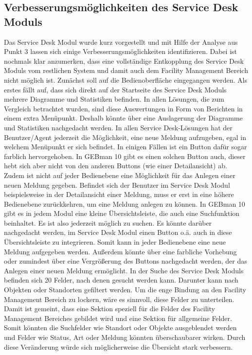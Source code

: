\subsection{Verbesserungsmöglichkeiten des Service Desk Moduls}
\noindent
Das Service Desk Modul wurde kurz vorgestellt und mit Hilfe der Analyse aus Punkt 3 lassen sich einige Verbesserungsmöglichkeiten identifizieren. Dabei ist nochmals klar anzumerken, dass eine vollständige Entkopplung des Service Desk Moduls vom restlichen System und damit auch dem Facility Management Bereich nicht möglich ist.\newline
Zunächst soll auf die Bedienoberfläche eingegangen werden. Als erstes fällt auf, dass sich direkt auf der Startseite des Service Desk Moduls mehrere Diagramme und Statistiken befinden. In allen Lösungen, die zum Vergleich betrachtet wurden, sind diese Auswertungen in Form von Berichten in einem extra Menüpunkt. Deshalb könnte über eine Auslagerung der Diagramme und Statistiken nachgedacht werden.\newline
In allen Service Desk-Lösungen hat der Benutzer/Agent jederzeit die Möglichkeit, eine neue Meldung aufzugeben, egal in welchem Menüpunkt er sich befindet. In einigen Fällen ist ein Button dafür sogar farblich hervorgehoben. In GEBman 10 gibt es einen solchen Button auch, dieser hebt sich aber nicht von den anderen Buttons (wie einer Detailansicht) ab. Zudem ist nicht auf jeder Bedienebene eine Möglichkeit für das Anlegen einer neuen Meldung gegeben. Befindet sich der Benutzer im Service Desk Modul beispielsweise in der Detailansicht einer Meldung, muss er erst in eine höhere Bedienebene zurückkehren, um eine Meldung anlegen zu können. In GEBman 10 gibt es in jedem Modul eine kleine Übersichtsleiste, die auch eine Suchfunktion beinhaltet. Es ist also jederzeit möglich zu suchen. Es könnte darüber nachgedacht werden, im Service Desk Modul einen Button o.ä. auch in diese Übersichtsleiste zu integrieren. Somit kann in jeder Bedienebene eine neue Meldung aufgegeben werden. Außerdem könnte über eine farbliche Vorhebung oder zumindest über eine Vergrößerung des Buttons nachgedacht werden, der das Anlegen einer neuen Meldung ermöglicht.\newline
In der Suche des Service Desk Moduls befinden sich 20 Felder, nach denen gesucht werden kann. Darunter kann nach Objekten oder Standorten gefiltert werden. Um die enge Bindung an den Facility Management Bereich zu lockern, wäre es sinnvoll, diese Felder zu unterteilen. Damit ist gemeint, dass eine Sektion speziell für die Felder des Facility Management Bereiches gebildet wird und eine Sektion für allgemeine Felder. Somit könnten die Suchfelder wie Standort oder Objekte ausgeblendet werden und Felder wie Status, Art oder Meldung könnten überschaubarer wirken. Durch diese Veränderung würde sich möglicherweise die Übersicht stark verbessern. \\

